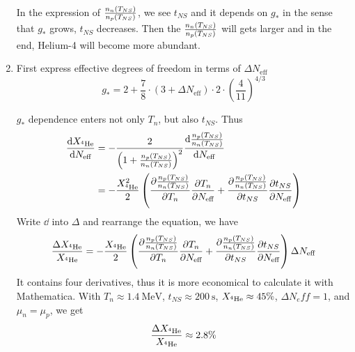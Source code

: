 \begin{enumerate}[label=\alph*)]
      In the expression of $\frac{n_n(T_{NS})}{n_p(T_{NS})}$, we see $t_{NS}$ and it depends on $g_*$ in the sense that $g_*$ grows, $t_{NS}$ decreases. Then the $\frac{n_n(T_{NS})}{n_p(T_{NS})}$ will gets larger and in the end, Helium-4 will become more abundant.

   \item 
      First express effective degrees of freedom in terms of $\Delta N_{\text{eff}}$
      \begin{equation}
         g_* = 2 + \frac{7}{8} \cdot (3 + \Delta N_\text{eff}) \cdot 2 \cdot \left( \frac{4}{11} \right)^{4/3}
      \end{equation}
      
      $g_*$ dependence enters not only $T_n$, but also $t_{NS}$. Thus
      \begin{align*}
         \dv{X_{{{}^4\text{He}}}}{N_{\text{eff}}} &= - \frac{2}{ \left(1 + \frac{n_p(T_{NS})}{n_n(T_{NS})} \right)^2  } \dv{\frac{n_p(T_{NS})}{n_n(T_{NS})}}{N_{\text{eff}}} \\
                               &= - \frac{X_{{{}^4\text{He}}}^2}{2} \left( \pdv{\frac{n_p(T_{NS})}{n_n(T_{NS})}}{T_n} \pdv{T_n}{N_{\text{eff}}} + \pdv{\frac{n_p(T_{NS})}{n_n(T_{NS})}}{t_{NS}}\pdv{t_{NS}}{N_{\text{eff}}} \right)
      \end{align*}
      Write $\dd$ into $\Delta$ and rearrange the equation, we have
      \begin{equation}
         \frac{\Delta X_{{}^4\text{He}}}{X_{{}^4\text{He}}} = - \frac{X_{{}^4\text{He}}}{2} \left( \pdv{\frac{n_p(T_{NS})}{n_n(T_{NS})}}{T_n} \pdv{T_n}{N_{\text{eff}}} + \pdv{\frac{n_p(T_{NS})}{n_n(T_{NS})}}{t_{NS}}\pdv{t_{NS}}{N_{\text{eff}}} \right) \Delta N_{\text{eff}}
      \end{equation}
      It contains four derivatives, thus it is more economical to calculate it with Mathematica. With $T_n \approx \SI{1.4}{\mega\eV}$, $t_{NS}\approx \SI{200}{\s}$, $X_{{}^4\text{He}} \approx 45\% $, $\Delta N_eff=1$, and $\mu_n = \mu_p$, we get 
      \begin{equation}
         \frac{\Delta X_{{}^4\text{He}}}{X_{{}^4\text{He}}} \approx 2.8\%
      \end{equation}
\end{enumerate}
